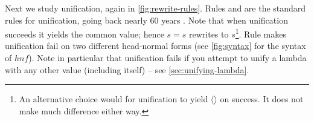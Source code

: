 \documentclass[acmsmall,review,anonymous,dvipsnames]{acmart}
\newcommand{\Varid}[1]{\mathit{#1}}
\begin{document}
Next we study unification, again in \cref{fig:rewrite-rules}.
Rules  and 
are the standard rules for unification, going back nearly 60 years \cite{robinson:unification}.
Note that
when unification succeeds it yields the common value; hence \ensuremath{\Varid{s}=\Varid{s}} rewrites
to \ensuremath{\Varid{s}}\footnote{An alternative choice would
for unification to yield \ensuremath{\langle\rangle} on success.  It does not make much difference
either way.}.
Rule  makes unification fail on two different head-normal forms (see
\cref{fig:syntax} for the syntax of \ensuremath{\mathit{hnf}}).
Note in particular that unification fails if you attempt to unify a
lambda with any other value (including itself) -- see \cref{sec:unifying-lambda}.


\end{document}
